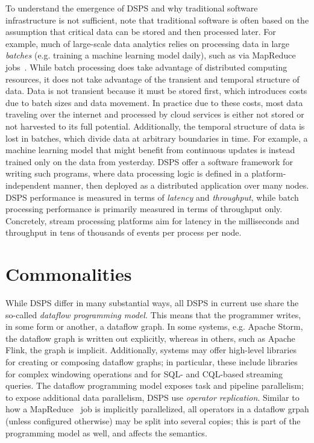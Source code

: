 To understand the emergence of DSPS and why traditional software infrastructure
is not sufficient, note that traditional software
is often based on the assumption that
critical data can be stored and then processed later.
For example,
much of large-scale data analytics relies on processing data in large
\emph{batches} (e.g. training a machine learning model daily),
such as via MapReduce jobs~\cite{dean2008mapreduce}.
While batch processing
does take advantage of distributed computing resources,
it does not take advantage of the transient and temporal structure of data.
Data is not transient because it must be stored first,
which introduces costs due to batch sizes and data movement.
In practice due to these costs, most data traveling over the internet
and processed by cloud services is either not stored or not harvested to its full potential.
Additionally, the temporal structure of data is lost in batches, which divide
data at arbitrary boundaries in time.
For example, a machine learning model that might benefit from continuous updates is instead trained only on the data from yesterday.
DSPS offer a software framework for writing such programs, where data processing logic is defined in a platform-independent manner,
then deployed as a distributed application over many nodes.
DSPS performance is measured in terms of \emph{latency} and \emph{throughput},
while batch processing performance is primarily measured in terms of throughput only.
Concretely, stream processing platforms aim for latency in the milliseconds and throughput in tens of thousands of events per process per node.

\section{Commonalities}

While DSPS differ in many substantial ways, all DSPS in current use share the so-called \emph{dataflow programming model.} This means that the programmer writes, in some form or another, a dataflow graph. In some systems, e.g. Apache Storm, the dataflow graph is written out explicitly, whereas in others, such as Apache Flink, the graph is implicit. Additionally, systems may offer high-level libraries for creating or composing dataflow graphs; in particular, these include libraries for complex windowing operations and for SQL- and CQL-based streaming queries.
The dataflow programming model exposes task and pipeline parallelism; to expose additional data parallelism, DSPS use \emph{operator replication}. Similar to how a MapReduce~\cite{dean2008mapreduce} job is implicitly parallelized, all operators in a dataflow grpah (unless configured otherwise) may be split into several copies; this is part of the programming model as well, and affects the semantics.

